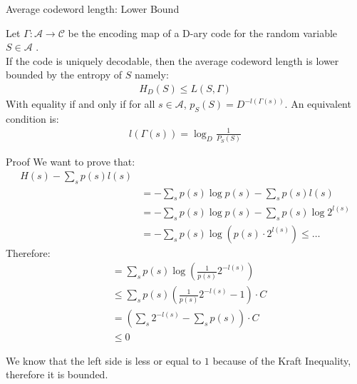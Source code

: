 \begin{parag}{Average codeword length: Lower Bound}
    \begin{theoreme}
        Let $ \Gamma : \mathcal{A} \to \mathcal{C}$ be the encoding map of a D-ary code for the random variable $S \in \mathcal{A}$ .\\
        If the code is uniquely decodable, then the average codeword length is lower bounded by the entropy of $S$ namely:
        \begin{align*} 
            H_D\left(S\right) \leq L\left(S, \Gamma\right)
        \end{align*}
        With equality if and only if for all $s \in \mathcal{A}$, $p_S\left(S\right) = D^{-l\left(\Gamma\left(s\right)\right)}$. An equivalent condition is:
        \begin{align*} 
            l\left(\Gamma\left(s\right)\right) =  \log_D \frac{1}{P_S\left(S\right)}
        \end{align*}
    \end{theoreme}
    \begin{subparag}{Proof}
        We want to prove that:
        \begin{align*}
            H(s) - \sum_s p(s)l(s) \\
            &= - \sum_s p(s) \log p(s) - \sum_s p(s)l(s) \\
            &= - \sum_s p(s)\log p(s) - \sum_s p(s) \log 2^{l(s)} \\
            &= -\sum_s p(s) \log (p(s) \cdot 2^{l(s)}) \leq \dots
        \end{align*}
        Therefore:
        \begin{align*}
            &= \sum_s p(s) \log ( \frac{1}{p(s)}2^{-l(s)}) \\
            &\leq \sum_s p(s) \left( \frac{1}{p(s)}2^{-l(s)} -1 \right) \cdot C \\
            &= (\sum_s 2^{-l(s)} - \sum_s p(s)) \cdot C \\
            &\leq 0
        \end{align*}
        
        We know that the left side is less or equal to $1$ because of the Kraft Inequality, therefore it is bounded.
        
    \end{subparag}
\end{parag}



